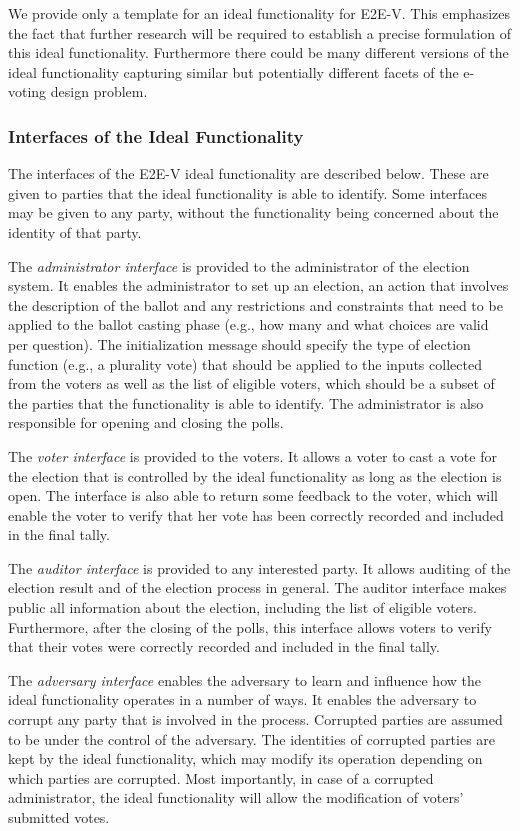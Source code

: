 We provide only a template for an ideal functionality for E2E-V. This
emphasizes the fact that further research will be required to
establish a precise formulation of this ideal
functionality. Furthermore there could be many different versions of
the ideal functionality capturing similar but potentially different
facets of the e-voting design problem.

\subsubsection{Interfaces of the Ideal Functionality}

The interfaces of the E2E-V ideal functionality are described
below. These are given to parties that the ideal functionality is able
to identify. Some interfaces may be given to any party, without the
functionality being concerned about the identity of that party.

The \emph{administrator interface} is provided to the administrator of
the election system.  It enables the administrator to set up an
election, an action that involves the description of the ballot and
any restrictions and constraints that need to be applied to the ballot
casting phase (e.g., how many and what choices are valid per
question). The initialization message should specify the type of
election function (e.g., a plurality vote) that should be applied to
the inputs collected from the voters as well as the list of eligible
voters, which should be a subset of the parties that the functionality
is able to identify. The administrator is also responsible for opening
and closing the polls.

The \emph{voter interface} is provided to the voters. It allows a
voter to cast a vote for the election that is controlled by the ideal
functionality as long as the election is open. The interface is also
able to return some feedback to the voter, which will enable the voter
to verify that her vote has been correctly recorded and included in
the final tally.

The \emph{auditor interface} is provided to any interested party.  It
allows auditing of the election result and of the election process in
general. The auditor interface makes public all information about the
election, including the list of eligible voters. Furthermore, after the
closing of the polls, this interface allows voters to verify that
their votes were correctly recorded and included in the final tally. 

The \emph{adversary interface} enables the adversary to learn and
influence how the ideal functionality operates in a number of ways. It
enables the adversary to corrupt any party that is involved in the
process. Corrupted parties are assumed to be under the control of the
adversary. The identities of corrupted parties are kept by the ideal
functionality, which may modify its operation depending on which
parties are corrupted. Most importantly, in case of a corrupted
administrator, the ideal functionality will allow the modification of
voters’ submitted votes.

